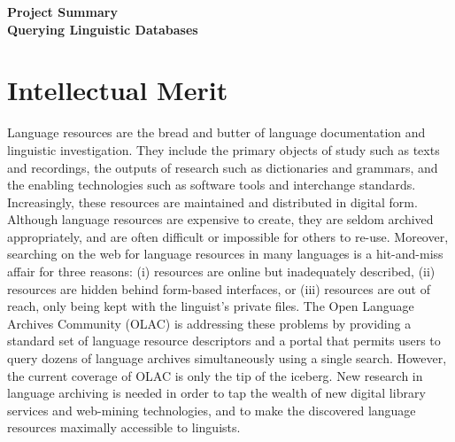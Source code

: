 \documentclass[11pt]{nsf}
\begin{document}
\begin{center}\textbf{\Large
Project Summary\\[2ex]
Querying Linguistic Databases
}\end{center}

\section*{Intellectual Merit}

%
%
Language resources are the bread and butter of
language documentation and linguistic investigation.
They include
the primary objects of study such as texts and recordings,
the outputs of research such as dictionaries and grammars,
and the enabling technologies such as software tools and interchange standards.
Increasingly, these resources are maintained and distributed in
digital form.
%
%
Although language resources are expensive to create,
they are seldom archived appropriately,
and are often difficult or impossible for others to re-use.
Moreover, searching on the web for language resources in many languages
is a hit-and-miss affair for three reasons:
(i) resources are online but inadequately described,
(ii) resources are hidden behind form-based interfaces, or
(iii) resources are out of reach, only being kept with the linguist's
private files.
%
%
The Open Language Archives Community (OLAC) is addressing these
problems by providing a standard set of language resource descriptors
and a portal that permits users to query dozens of language archives
simultaneously using a single search.  However, the current coverage
of OLAC is only the tip of the iceberg.  New research in language
archiving is needed in order to tap the wealth of
new digital library services and web-mining technologies, and
to make the discovered language resources maximally accessible to linguists.
\end{document}
